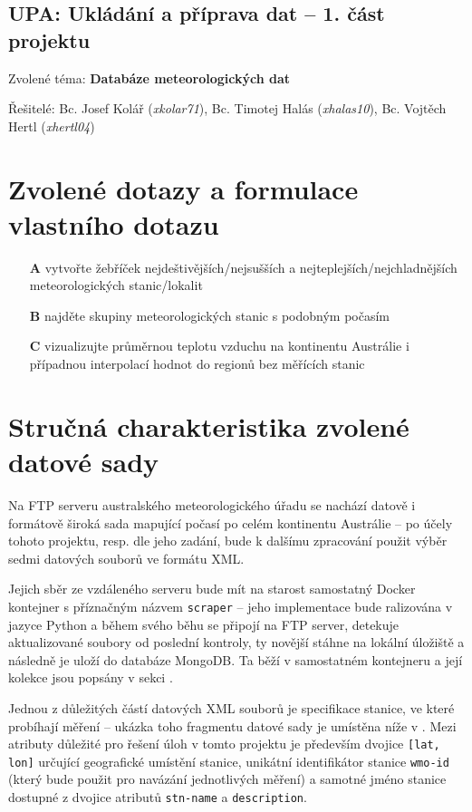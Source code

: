 \documentclass[10pt,a4paper,titlepage]{extarticle}
\begin{document}
\pagestyle{empty}
\begin{center}
	\section*{UPA: Ukládání a příprava dat -- 1. část projektu}
\end{center}

\large{Zvolené téma: \textbf{Databáze meteorologických dat}}

\large{
	Řešitelé:
	Bc. Josef Kolář (\textit{xkolar71}),
	Bc. Timotej Halás (\textit{xhalas10}),
	Bc. Vojtěch Hertl (\textit{xhertl04})
}%
\section{Zvolené dotazy a formulace vlastního dotazu}
\begin{itemize}
	\item[\textbf{A}] vytvořte žebříček nejdeštivějších/nejsušších a nejteplejších/nejchladnějších meteorologických stanic/lokalit
	\item[\textbf{B}] najděte skupiny meteorologických stanic s podobným počasím
	\item[\textbf{C}] vizualizujte průměrnou teplotu vzduchu na kontinentu Austrálie i případnou interpolací hodnot
    do regionů bez měřících stanic
\end{itemize}%
\section{Stručná charakteristika zvolené datové sady}
Na FTP serveru australského meteorologického úřadu se nachází datově i formátově široká sada mapující počasí po celém
kontinentu Austrálie -- po účely tohoto projektu, resp. dle jeho zadání, bude k dalšímu zpracování použit výběr sedmi
datových souborů ve formátu XML.

Jejich sběr ze vzdáleného serveru bude mít na starost samostatný Docker kontejner s příznačným názvem
\texttt{scraper} -- jeho implementace bude ralizována v jazyce Python a během svého běhu se připojí na FTP server,
detekuje aktualizované soubory od poslední kontroly, ty novější stáhne na lokální úložiště a následně je uloží
do databáze MongoDB. Ta běží v samostatném kontejneru a její kolekce jsou popsány v sekci
.

Jednou z důležitých částí datových XML souborů je specifikace stanice, ve které probíhají měření -- ukázka toho
fragmentu datové sady je umístěna níže v . Mezi atributy důležité pro řešení úloh v
tomto projektu je především dvojice \mbox{\texttt{[lat, lon]}} určující geografické umístění stanice, unikátní
identifikátor stanice \texttt{wmo-id} (který bude použit pro navázání jednotlivých měření) a samotné jméno stanice
dostupné z dvojice atributů \texttt{stn-name} a \texttt{description}.
\end{document}
